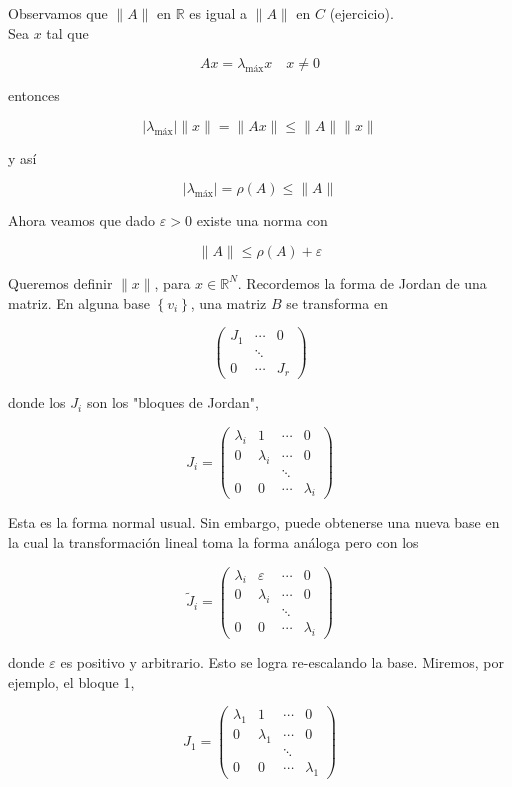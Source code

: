 \documentclass[10pt]{article}
\begin{document}
Observamos que $\|A\|$ en $\mathbb{R}$ es igual a $\|A\|$ en $C$ (ejercicio).\\
Sea $x$ tal que

$$
A x=\lambda_{\operatorname{máx}} x \quad x \neq 0
$$

entonces

$$
\left|\lambda_{\operatorname{máx}}\right|\|x\|=\|A x\| \leq\|A\|\|x\|
$$

y así

$$
\left|\lambda_{\operatorname{máx}}\right|=\rho(A) \leq\|A\|
$$

Ahora veamos que dado $\varepsilon>0$ existe una norma con

$$
\|A\| \leq \rho(A)+\varepsilon
$$

Queremos definir $\|x\|$, para $x \in \mathbb{R}^{N}$. Recordemos la forma de Jordan de una matriz. En alguna base $\left\{v_{i}\right\}$, una matriz $B$ se transforma en

$$
\left(\begin{array}{ccc}
J_{1} & \cdots & 0 \\
& \ddots & \\
0 & \cdots & J_{r}
\end{array}\right)
$$

donde los $J_{i}$ son los "bloques de Jordan",

$$
J_{i}=\left(\begin{array}{cccc}
\lambda_{i} & 1 & \cdots & 0 \\
0 & \lambda_{i} & \cdots & 0 \\
& & \ddots & \\
0 & 0 & \cdots & \lambda_{i}
\end{array}\right)
$$

Esta es la forma normal usual. Sin embargo, puede obtenerse una nueva base en la cual la transformación lineal toma la forma análoga pero con los

$$
\tilde{J}_{i}=\left(\begin{array}{cccc}
\lambda_{i} & \varepsilon & \cdots & 0 \\
0 & \lambda_{i} & \cdots & 0 \\
& & \ddots & \\
0 & 0 & \cdots & \lambda_{i}
\end{array}\right)
$$

donde $\varepsilon$ es positivo y arbitrario. Esto se logra re-escalando la base. Miremos, por ejemplo, el bloque 1,

$$
J_{1}=\left(\begin{array}{cccc}
\lambda_{1} & 1 & \cdots & 0 \\
0 & \lambda_{1} & \cdots & 0 \\
& & \ddots & \\
0 & 0 & \cdots & \lambda_{1}
\end{array}\right)
$$
\end{document}
